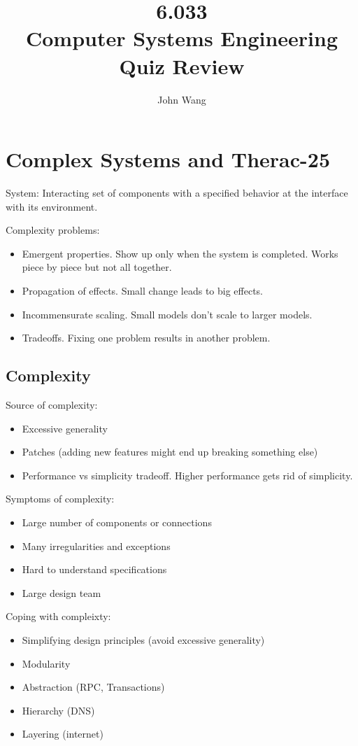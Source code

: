 \documentclass[psamsfonts]{amsart}
\title{6.033 \\
Computer Systems Engineering \\
Quiz Review
}
\author{John Wang}
\begin{document}
\maketitle

\section{Complex Systems and Therac-25}

System: Interacting set of components with a specified behavior at the interface with its environment.

Complexity problems:
\begin{itemize}
  \item Emergent properties. Show up only when the system is completed. Works piece by piece but not all together.
  \item Propagation of effects. Small change leads to big effects.
  \item Incommensurate scaling. Small models don't scale to larger models.
  \item Tradeoffs. Fixing one problem results in another problem.
\end{itemize}

\subsection{Complexity}

Source of complexity:
\begin{itemize}
  \item Excessive generality
  \item Patches (adding new features might end up breaking something else)
  \item Performance vs simplicity tradeoff. Higher performance gets rid of simplicity.
\end{itemize}

Symptoms of complexity:
\begin{itemize}
  \item Large number of components or connections
  \item Many irregularities and exceptions
  \item Hard to understand specifications
  \item Large design team
\end{itemize}

Coping with compleixty:
\begin{itemize}
  \item Simplifying design principles (avoid excessive generality)
  \item Modularity
  \item Abstraction (RPC, Transactions)
  \item Hierarchy (DNS)
  \item Layering (internet)
\end{itemize}
\end{document}
